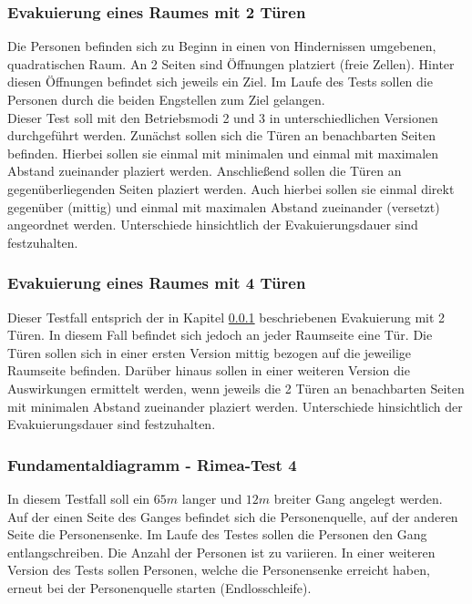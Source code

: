 \subsubsection{Evakuierung eines Raumes mit 2 Türen}
\label{Anforderungen:Evakuierung2}
Die Personen befinden sich zu Beginn in einen von Hindernissen umgebenen, quadratischen Raum. An 2 Seiten sind Öffnungen platziert (freie Zellen). Hinter diesen Öffnungen befindet sich jeweils ein Ziel. Im Laufe des Tests sollen die Personen durch die beiden Engstellen zum Ziel gelangen. \\
Dieser Test soll mit den Betriebsmodi 2 und 3 in unterschiedlichen Versionen durchgeführt werden. Zunächst sollen sich die Türen an benachbarten Seiten befinden. Hierbei sollen sie einmal mit minimalen und einmal mit maximalen Abstand zueinander plaziert werden. Anschließend sollen die Türen an gegenüberliegenden Seiten plaziert werden. Auch hierbei sollen sie einmal direkt gegenüber (mittig) und einmal mit maximalen Abstand zueinander (versetzt) angeordnet werden. Unterschiede hinsichtlich der Evakuierungsdauer sind festzuhalten.

\subsubsection{Evakuierung eines Raumes mit 4 Türen}
Dieser Testfall entsprich der in Kapitel \ref{Anforderungen:Evakuierung2} beschriebenen Evakuierung mit 2 Türen. In diesem Fall befindet sich jedoch an jeder Raumseite eine Tür. Die Türen sollen sich in einer ersten Version mittig bezogen auf die jeweilige Raumseite befinden. Darüber hinaus sollen in einer weiteren Version die Auswirkungen ermittelt werden, wenn jeweils die 2 Türen an benachbarten Seiten mit minimalen Abstand zueinander plaziert werden. Unterschiede hinsichtlich der Evakuierungsdauer sind festzuhalten.

\subsubsection{Fundamentaldiagramm - Rimea-Test 4}
\label{Anforderungen:RimeaTest}
In diesem Testfall soll ein $65m$ langer und $12m$ breiter Gang angelegt werden. Auf der einen Seite des Ganges befindet sich die Personenquelle, auf der anderen Seite die Personensenke. Im Laufe des Testes sollen die Personen den Gang entlangschreiben. Die Anzahl der Personen ist zu variieren. In einer weiteren Version des Tests sollen Personen, welche die Personensenke erreicht haben, erneut bei der Personenquelle starten (Endlosschleife).

